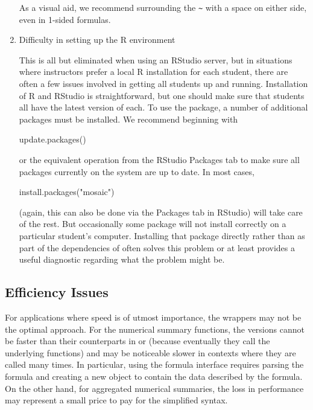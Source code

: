\begin{enumerate}
  As a visual aid, we recommend surrounding the
  \texttt{\textasciitilde{}} with a space on either side, even in
  1-sided formulas.
\item
  Difficulty in setting up the R environment

  This is all but eliminated when using an RStudio server, but in
  situations where instructors prefer a local R installation for each
  student, there are often a few issues involved in getting all students
  up and running. Installation of R and RStudio is straightforward, but
  one should make sure that students all have the latest version of
  each. To use the  package, a number of additional packages
  must be installed. We recommend beginning with

  \begin{Schunk}
  \begin{Sinput}
  update.packages()
  \end{Sinput}
  \end{Schunk}

  or the equivalent operation from the RStudio Packages tab to make sure
  all packages currently on the system are up to date. In most cases,

  \begin{Schunk}
  \begin{Sinput}
  install.packages("mosaic")
  \end{Sinput}
  \end{Schunk}

  (again, this can also be done via the Packages tab in RStudio) will
  take care of the rest. But occasionally some package will not install
  correctly on a particular student's computer. Installing that package
  directly rather than as part of the dependencies of  often
  solves this problem or at least provides a useful diagnostic regarding
  what the problem might be.
\end{enumerate}

\subsection{Efficiency Issues}\label{efficiency-issues}

For applications where speed is of utmost importance, the 
wrappers may not be the optimal approach. For the numerical summary
functions, the  versions cannot be faster than their
counterparts in  or  (because eventually they call
the underlying functions) and may be noticeable slower in contexts where
they are called many times. In particular, using the formula interface
requires parsing the formula and creating a new object to contain the
data described by the formula. On the other hand, for aggregated
numerical summaries, the loss in performance may represent a small price
to pay for the simplified syntax.

